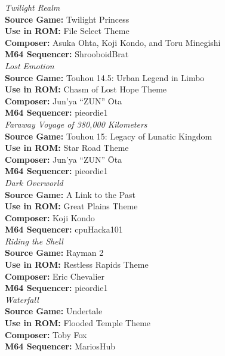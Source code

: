 \documentclass[11pt]{article}
\begin{document}
\textit{\Large Twilight Realm}\\
\textbf{\small Source Game:} Twilight Princess\\
\textbf{\small Use in ROM:} File Select Theme\\
\textbf{\small Composer:} Asuka Ohta, Koji Kondo, and Toru Minegishi\\
\textbf{\small M64 Sequencer:} ShrooboidBrat\\
\break
\textit{\Large Lost Emotion}\\
\textbf{\small Source Game:} Touhou 14.5: Urban Legend in Limbo\\
\textbf{\small Use in ROM:} Chasm of Lost Hope Theme\\
\textbf{\small Composer:} Jun'ya ``ZUN'' Ōta\\
\textbf{\small M64 Sequencer:} pieordie1\\
\pagebreak \break
\textit{\Large Faraway Voyage of 380,000 Kilometers}\\
\textbf{\small Source Game:} Touhou 15: Legacy of Lunatic Kingdom\\
\textbf{\small Use in ROM:} Star Road Theme\\
\textbf{\small Composer:} Jun'ya ``ZUN'' Ōta\\
\textbf{\small M64 Sequencer:} pieordie1\\
\break
\textit{\Large Dark Overworld}\\
\textbf{\small Source Game:} A Link to the Past\\
\textbf{\small Use in ROM:} Great Plains Theme\\
\textbf{\small Composer:} Koji Kondo\\
\textbf{\small M64 Sequencer:} cpuHacka101\\
\break
\textit{\Large Riding the Shell}\\
\textbf{\small Source Game:} Rayman 2\\
\textbf{\small Use in ROM:} Restless Rapids Theme\\
\textbf{\small Composer:} 	Eric Chevalier\\
\textbf{\small M64 Sequencer:} pieordie1\\
\break
\textit{\Large Waterfall}\\
\textbf{\small Source Game:} Undertale\\
\textbf{\small Use in ROM:} Flooded Temple Theme\\
\textbf{\small Composer:} Toby Fox\\
\textbf{\small M64 Sequencer:} MariosHub\\
\end{document}
